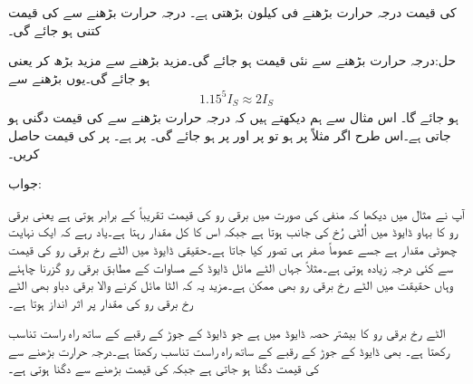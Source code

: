  کی قیمت درجہ حرارت بڑھنے   فی کیلون بڑھتی ہے۔ درجہ حرارت بڑھنے سے  کی قیمت کتنی ہو جائے گی۔

حل:درجہ حرارت  بڑھنے سے نئی قیمت  ہو جائے گی۔مزید  بڑھنے سے   مزید  بڑھ کر  یعنی  ہو جائے گی۔یوں  بڑھنے سے
\begin{align*}
1.15^5 I_S \approx 2 I_S
\end{align*} 
ہو جائے گا۔
اس مثال سے ہم دیکھتے ہیں کہ درجہ حرارت  بڑھنے سے  کی قیمت دگنی ہو جاتی ہے۔اس طرح اگر مثلاً  پر  ہو تو  پر  اور  پر  ہو جائے گی۔
 پر   ہے۔  پر  کی قیمت حاصل کریں۔

جواب:

آپ نے مثال  میں دیکھا کہ منفی  کی صورت میں برقی رو کی قیمت   تقریباً  کے برابر ہوتی ہے یعنی برقی رو کا بہاو ڈایوڈ میں اُلٹی رُخ کی جانب ہوتا ہے جبکہ اس کا کل مقدار  رہتا ہے۔یاد رہے کہ  ایک نہایت چھوٹی مقدار ہے جسے عموماً صفر ہی تصور کیا جاتا ہے۔حقیقی ڈایوڈ میں الٹے رخ برقی رو کی قیمت   سے کئی درجہ زیادہ ہوتی ہے۔مثلاً جہاں الٹے مائل ڈایوڈ کے مساوات کے مطابق  برقی رو گزرنا چاہئے وہاں حقیقت میں الٹے رخ  برقی رو بھی ممکن ہے۔مزید یہ کہ الٹا مائل کرنے والا برقی دباو بھی الٹے رخ برقی رو کی مقدار  پر اثر انداز ہوتا ہے۔

الٹے رخ برقی رو کا بیشتر حصہ ڈایوڈ میں   ہے جو ڈایوڈ کے  جوڑ کے رقبے کے ساتھ راہ راست تناسب رکھتا ہے۔ بھی ڈایوڈ کے  جوڑ کے رقبے کے ساتھ راہ راست تناسب رکھتا  ہے۔درجہ حرارت  بڑھنے سے کی قیمت دگنا ہو جاتی ہے جبکہ   کی قیمت   بڑھنے سے دگنا ہوتی ہے۔


